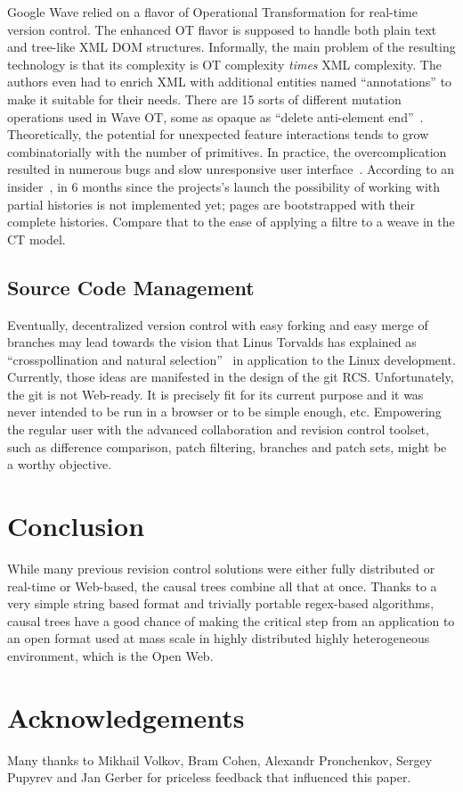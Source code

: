 \documentclass{acm_proc_article-sp}
\begin{document}
Google Wave relied on a flavor of Operational Transformation for
real-time version control. The enhanced OT flavor is supposed to
handle both plain text and tree-like XML DOM structures.
Informally, the main problem of the resulting technology is that
its complexity is OT complexity \emph{times} XML complexity. 
The authors even had to enrich XML with additional entities 
named ``annotations'' to make it suitable for their needs.
There are 15 sorts of different mutation operations used in Wave
OT, some as opaque as ``delete anti-element end''~\cite{waveot}.
Theoretically, the potential for unexpected feature interactions
tends to grow combinatorially with the number of primitives.
In practice, the overcomplication resulted in numerous bugs and
slow unresponsive user interface~\cite{own-experience}.
According to an insider~\cite{gerasimov}, in 6 months since the
projects's launch the possibility of working with partial
histories is not  implemented yet; pages are bootstrapped with
their complete histories. Compare that to the ease of applying
a filtre to a weave in the CT model.

\subsection{Source Code Management}

Eventually, decentralized version control with easy forking and easy merge of branches may lead towards the vision that Linus Torvalds has explained as ``crosspollination and natural selection''~\cite{linus-pollinates} in application to the Linux development.
Currently, those ideas are manifested in the design of the git RCS.
Unfortunately, the git is not Web-ready.
It is precisely fit for its current purpose and it was never intended to be run in a browser or to be simple enough, etc.
Empowering the regular user with the advanced collaboration and revision control toolset, such as difference comparison, patch filtering, branches and patch sets, might be a worthy objective.

\section {Conclusion} \label{sec:conclusion}

While many previous revision control solutions were either
fully distributed or real-time or Web-based, the causal trees
combine all that at once. Thanks to a very simple string based
format and trivially portable regex-based algorithms, causal trees
have a good chance of making the critical step from an
application to an open format used at mass scale in highly
distributed highly heterogeneous environment, which is the Open Web.


\section{Acknowledgements}

Many thanks to Mikhail Volkov, Bram Cohen,
Alexandr Pronchenkov, Sergey Pupyrev and Jan Gerber for priceless
feedback that influenced this paper.




\end{document}

